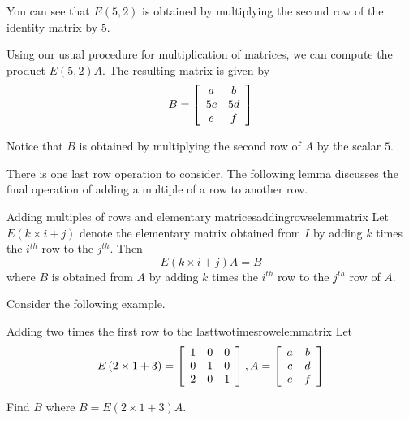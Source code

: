 \begin{solution}
You can see that $E \left(5, 2\right)$ is obtained by multiplying the second row 
of the identity matrix by $5$.

Using our usual procedure for multiplication of matrices, we can compute the product $E \left(5, 2\right)A$. The 
resulting matrix is given by 
\begin{equation*}
B
=\left[
\begin{array}{cc}
a & b \\
5c & 5d \\
e & f
\end{array}
\right]
\end{equation*}

Notice that $B$ is obtained by multiplying the second row of $A$ by the scalar $5$. 
\end{solution}

There is one last row operation to consider. The following lemma discusses the final
operation of adding a multiple of a row to another row.

\begin{lemma}{Adding multiples of rows and elementary matrices}{addingrowselemmatrix}
Let $E\left( k \times i+j\right) $ denote the elementary
matrix obtained from $I$ by adding $k$ times the $i^{th}$ row to the $j^{th}$. Then
\begin{equation*}
E\left( k \times i+j\right) A=B
\end{equation*}
where $B$ is obtained from $A$ by adding $k$ times the $i^{th}$ row to the $j^{th}$ row of $A.$
\end{lemma}

Consider the following example.

\begin{example}{Adding two times the first row to the last}{twotimesrowelemmatrix}
Let
\begin{equation*}
E\left( 2 \times 1+3\right) = \left[
\begin{array}{rrr}
1 & 0 & 0 \\
0 & 1 & 0 \\
2 & 0 & 1
\end{array}
\right], A =  \left[
\begin{array}{cc}
a & b \\
c & d \\
e & f
\end{array}
\right] 
\end{equation*}

Find $B$ where $B = E\left( 2 \times 1+3\right)A$.
\end{example}

